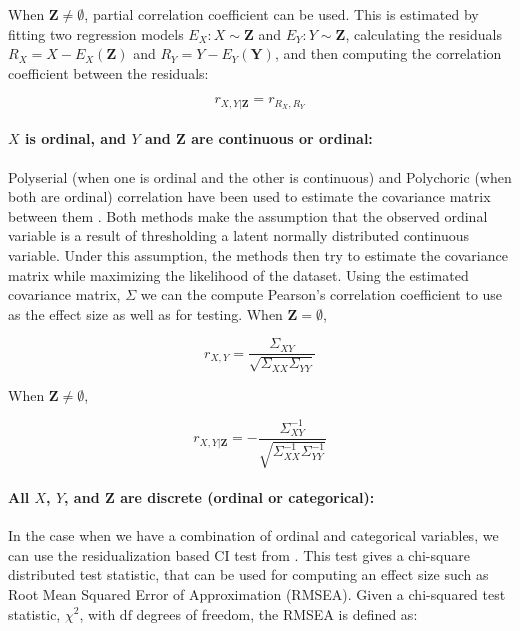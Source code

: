 \documentclass{uai2025} %
\begin{document}
When $ \bm{Z} \neq \emptyset $, partial correlation coefficient can be used.
This is estimated by fitting two regression models $ E_X: X \sim \bm{Z} $ and $
E_Y: Y \sim \bm{Z} $, calculating the residuals $ R_X = X - E_X(\bm{Z}) $ and $
R_Y = Y - E_Y(\bm{Y}) $, and then computing the correlation coefficient between
the residuals:

\begin{equation}
	r_{X, Y \rvert \bm{Z}} = r_{R_X, R_Y}
\end{equation}

\paragraph{$ X $ is ordinal, and $ Y $ and $ \bm{Z} $  are continuous or ordinal: }

Polyserial (when one is ordinal and the other is continuous) and Polychoric
(when both are ordinal) correlation have been used to estimate the covariance
matrix between them \citep{Poon1987}. Both methods make the assumption that the
observed ordinal variable is a result of thresholding a latent normally
distributed continuous variable. Under this assumption, the methods then try to
estimate the covariance matrix while maximizing the likelihood of the dataset.
Using the estimated covariance matrix, $ \Sigma $ we can the compute Pearson's
correlation coefficient to use as the effect size as well as for testing. When
$ \bm{Z} = \emptyset $,

\begin{equation}
	r_{X, Y} = \frac{\Sigma_{XY}}{\sqrt{\Sigma_{XX} \Sigma_{YY}}}
\end{equation}

When $ \bm{Z} \neq \emptyset $, 

\begin{equation}
	r_{X, Y \rvert \bm{Z}} = - \frac{\Sigma^{-1}_{XY}}{\sqrt{\Sigma^{-1}_{XX} \Sigma^{-1}_{YY}}}
\end{equation}

\paragraph{All $ X $, $ Y $, and $ \bm{Z} $ are discrete (ordinal or categorical): }

In the case when we have a combination of ordinal and categorical variables, we
can use the residualization based CI test from \citep{Ankan2023}. This test
gives a chi-square distributed test statistic, that can be used for computing
an effect size such as Root Mean Squared Error of Approximation (RMSEA). Given
a chi-squared test statistic, $ \chi^2 $, with $ \textrm{df} $ degrees of
freedom, the RMSEA is defined as:
\end{document}
